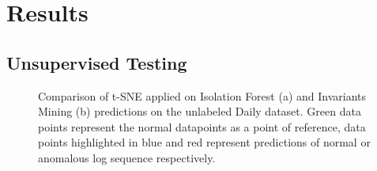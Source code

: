 \chapter{Results}

\section{Unsupervised Testing}

\begin{figure}%
    \centering
    \qquad
    \caption{Comparison of t-SNE applied on Isolation Forest (a) and Invariants Mining (b) predictions on the unlabeled Daily dataset. Green data points represent the normal datapoints as a point of reference, data points highlighted in blue and red represent predictions of normal or anomalous log sequence respectively.}%
    \label{fig:tsne-unlabeled-plots-appendix}%
\end{figure}

